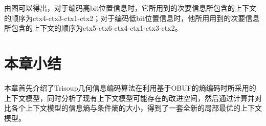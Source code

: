 \documentclass[bachelor,print,msfonts]{xduthesis}
\begin{document}
由图可以得出，对于编码高bit位置信息时，它所用到的次要信息所包含的上下文的顺序为ctx4-ctx3-ctx1-ctx2；对于编码低bit位置信息时，他所用用到的次要信息所包含的上下文的顺序为ctx5-ctx6-ctx4-ctx1-ctx3-ctx2。
\section{本章小结}
本章首先介绍了Trisoup几何信息编码算法在利用基于OBUF的熵编码时所采用的上下文模型，同时分析了现有上下文模型可能存在的改进空间，然后通过计算并对比各个上下文模型的信息熵与条件熵的大小，得到了一套全新的局部最优的上下文模型。

\ifx\allfiles\undefined
\end{document}
